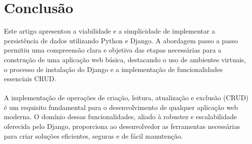 \documentclass[11pt]{article} %
\begin{document}
\maketitle
\section{Conclusão}
Este artigo apresentou a viabilidade e a simplicidade de implementar a persistência de dados utilizando Python e Django. A abordagem passo a passo permitiu uma compreensão clara e objetiva das etapas necessárias para a construção de uma aplicação web básica, destacando o uso de ambientes virtuais, o processo de instalação do Django e a implementação de funcionalidades essenciais CRUD.\\\\
A implementação de operações de criação, leitura, atualização e exclusão (CRUD) é um requisito fundamental para o desenvolvimento de qualquer aplicação web moderna. O domínio dessas funcionalidades, aliado à robustez e escalabilidade oferecida pelo Django, proporciona ao desenvolvedor as ferramentas necessárias para criar soluções eficientes, seguras e de fácil manutenção.
\end{document}

